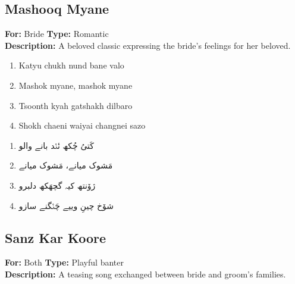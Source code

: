 \documentclass[12pt]{article}
\newcommand{\bigroman}[1]{\fontsize{16pt}{18pt}\selectfont\RaggedRight #1}
\newcommand{\bigarabic}[1]{\fontsize{16pt}{18pt}\selectfont \textarabic{#1}}
\begin{document}
\subsection*{Mashooq Myane}
\textbf{For:} Bride \quad \textbf{Type:} Romantic\\
\textbf{Description:} A beloved classic expressing the bride's feelings for her beloved.

\begin{multicols}{2}
\begin{enumerate}[leftmargin=*, label=\arabic*., font=\fontsize{16pt}{18pt}\selectfont]
  \item \bigroman{Katyu chukh nund bane valo}
  \item \bigroman{Mashok myane, mashok myane}
  \item \bigroman{Tsoonth kyah gatshakh dilbaro}
  \item \bigroman{Shokh chaeni waiyai changnei sazo}
\end{enumerate}

\columnbreak

\begin{RTL}
\begin{enumerate}[leftmargin=*, label=\arabic*., font=\fontsize{16pt}{18pt}\selectfont]
  \item \bigarabic{کَتیُ چُکھ نٔنٛد بانے والو}
  \item \bigarabic{مَشوک میانے، مَشوک میانے}
  \item \bigarabic{ژۆنتھ کیہ گچھَکھ دلبرو}
  \item \bigarabic{شۆخ چینِ وییے چَنٛگنے سازو}
\end{enumerate}
\end{RTL}
\end{multicols}

\subsection*{Sanz Kar Koore}
\textbf{For:} Both \quad \textbf{Type:} Playful banter\\
\textbf{Description:} A teasing song exchanged between bride and groom's families.
\end{document}
